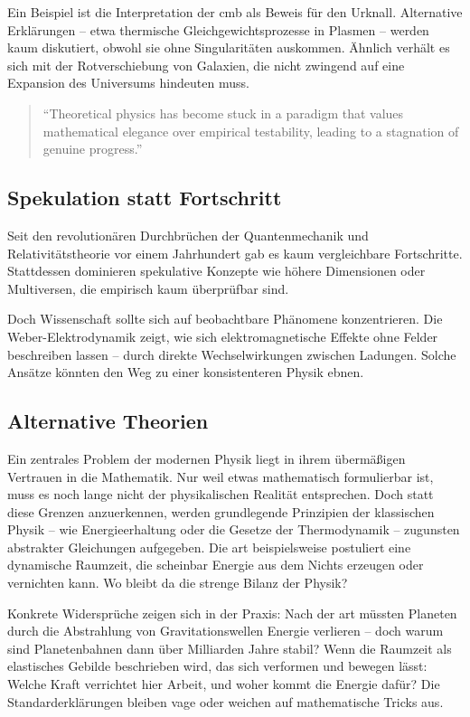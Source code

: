 Ein Beispiel ist die Interpretation der \gls{cmb} als Beweis für den Urknall. Alternative Erklärungen – etwa thermische Gleichgewichtsprozesse in Plasmen – werden kaum diskutiert, obwohl sie
ohne Singularitäten auskommen. Ähnlich verhält es sich mit der Rotverschiebung von Galaxien, die nicht zwingend auf eine Expansion des Universums hindeuten muss.
\begin{quote}
    \enquote{Theoretical physics has become stuck in a paradigm that values mathematical elegance over empirical testability, leading to a stagnation of genuine progress.} \cite{Smolin2006}
\end{quote}

\subsection{Spekulation statt Fortschritt}
Seit den revolutionären Durchbrüchen der Quantenmechanik und Relativitätstheorie vor einem Jahrhundert gab es kaum vergleichbare Fortschritte. Stattdessen dominieren spekulative Konzepte wie
höhere Dimensionen oder Multiversen, die empirisch kaum überprüfbar sind.

Doch Wissenschaft sollte sich auf beobachtbare Phänomene konzentrieren. Die Weber-Elektrodynamik zeigt, wie sich elektromagnetische Effekte ohne Felder beschreiben lassen – durch direkte
Wechselwirkungen zwischen Ladungen. Solche Ansätze könnten den Weg zu einer konsistenteren Physik ebnen.

\subsection{Alternative Theorien}
Ein zentrales Problem der modernen Physik liegt in ihrem übermäßigen Vertrauen in die Mathematik. Nur weil etwas mathematisch formulierbar ist,
muss es noch lange nicht der physikalischen Realität entsprechen. Doch statt diese Grenzen anzuerkennen, werden grundlegende Prinzipien der klassischen Physik – wie Energieerhaltung
oder die Gesetze der Thermodynamik – zugunsten abstrakter Gleichungen aufgegeben. Die \gls{art} beispielsweise postuliert eine dynamische Raumzeit, die scheinbar Energie aus dem Nichts
erzeugen oder vernichten kann. Wo bleibt da die strenge Bilanz der Physik?

Konkrete Widersprüche zeigen sich in der Praxis: Nach der \gls{art} müssten Planeten durch die Abstrahlung von Gravitationswellen Energie verlieren – doch warum sind Planetenbahnen dann über
Milliarden Jahre stabil? Wenn die Raumzeit als elastisches Gebilde beschrieben wird, das sich verformen und bewegen lässt: Welche Kraft verrichtet hier Arbeit, und woher kommt die Energie
dafür? Die Standarderklärungen bleiben vage oder weichen auf mathematische Tricks aus.

